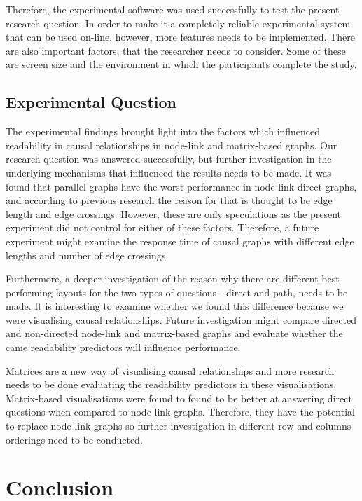 \documentclass{l4proj}
\begin{document}
Therefore, the experimental software was used successfully to test the present research question. In order to make it a completely reliable experimental system that can be used on-line, however, more features needs to be implemented. There are also important factors, that the researcher needs to consider. Some of these are screen size and the environment in which the participants complete the study.

\subsection{Experimental Question}

The experimental findings brought light into the factors which influenced readability in causal relationships in node-link and matrix-based graphs. Our research question was answered successfully, but further investigation in the underlying mechanisms that influenced the results needs to be made. It was found that parallel graphs have the worst performance in node-link direct graphs, and according to previous research the reason for that is thought to be edge length and edge crossings. However, these are only speculations as the present experiment did not control for either of these factors. Therefore, a future experiment might examine the response time of causal graphs with different edge lengths and number of edge crossings. 

Furthermore, a deeper investigation of the reason why there are different best performing layouts for the two types of questions - direct and path, needs to be made. It is interesting to examine whether we found this difference because we were visualising causal relationships. Future investigation might compare directed and non-directed node-link and matrix-based graphs and evaluate whether the came readability predictors will influence performance.

Matrices are a new way of visualising causal relationships and more research needs to be done evaluating the readability predictors in these visualisations. Matrix-based visualisations were found to found to be better at answering direct questions when compared to node link graphs. Therefore, they have the potential to replace node-link graphs so further investigation in different row and columns orderings need to be conducted. 

\section{Conclusion}
\end{document}
